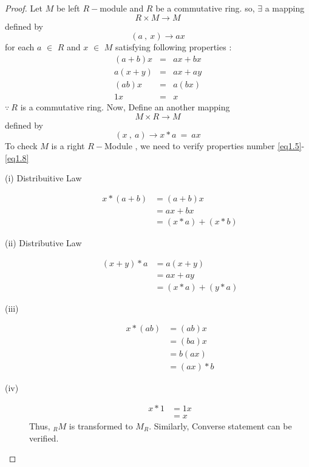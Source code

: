 \begin{proof} Let $M$ be left $R-$module and $R$ be a commutative ring. \newline
	so, $\exists$ a mapping
\begin{equation*}
R \times M \rightarrow M
\end{equation*}	
defined by
\begin{equation*}
(a \ , \ x) \rightarrow ax
\end{equation*}
for each $a$ $\in$ $R$ and $x$ $\in$ $M$ satisfying following properties :
\begin{eqnarray*}
(a+b) x &=& ax + bx \\ a(x+y) &=& ax + ay \\ (ab)x &=& a(bx) \\ 1x &=& x
\end{eqnarray*}
$\because \ R$ is a commutative ring.\newline
Now, Define an another mapping
 \begin{equation*}
 M \times R \rightarrow M
 \end{equation*}	
 defined by
 \begin{equation*}
 (x \ ,\ a) \rightarrow x*a \ = \ ax
 \end{equation*}
To check $M$ is a right $R-$Module , we need to verify properties number \eqref{eq1.5}-\eqref{eq1.8}
 \begin{description}
 	\item[(i) Distribuitive Law]
 	\begin{align*}
 		x*(a+b) &= (a+b)x \\ &= ax + bx \\ &= (x*a) + (x*b)
 	\end{align*}
 	\item[(ii) Distributive Law] \begin{align*}
 		(x+y)*a &= a(x+y) \\ &= ax + ay \\ &= (x*a) + (y*a)
 	      \end{align*}
       \item[(iii)]  \begin{align*}
       x*(ab) &= (ab)x \\ &= (ba)x \\ &= b(ax) \\ &= (ax)*b
       \end{align*}
   \item[(iv)] \begin{align*}
   x*1 &= 1x \\  &= x
   \end{align*}
Thus, $_{R}M$ is transformed to $M_R$.\newline
Similarly, Converse statement can be verified.
\end{description}
\end{proof} \bigskip
